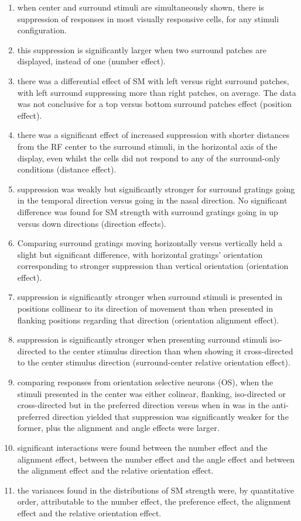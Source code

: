 \begin{enumerate}
\item when center and surround stimuli are simultaneously shown, there is suppression of responses in most visually responsive cells, for any stimuli configuration.
\item this suppression is significantly larger when two surround patches are displayed, instead of one (number effect).
\item there was a differential effect of SM with left versus right surround patches, with left surround suppressing more than right patches, on average. The data was not conclusive for a top versus bottom surround patches effect (position effect).
\item there was a significant effect of increased suppression with shorter distances from the RF center to the surround stimuli, in the horizontal axis of the display, even whilst the cells did not respond to any of the surround-only conditions (distance effect).
\item suppression was weakly but significantly stronger for surround gratings going in the temporal direction versus going in the nasal direction. No significant difference was found for SM strength with surround gratings going in up versus down directions (direction effects).
\item Comparing surround gratings moving horizontally versus vertically held a slight but significant difference, with horizontal gratings' orientation corresponding to stronger suppression than vertical orientation (orientation effect).
\item suppression is significantly stronger when surround stimuli is presented in positions collinear to its direction of movement than when presented in flanking positions regarding that direction (orientation alignment effect).
\item suppression is significantly stronger when presenting surround stimuli iso-directed to the center stimulus direction than when showing it cross-directed to the center stimulus direction (surround-center relative orientation effect).
\item comparing responses from orientation selective neurons (OS), when the stimuli presented in the center was either colinear, flanking, iso-directed or cross-directed but in the preferred direction versus when in was in the anti-preferred direction yielded that suppression was significantly weaker for the former, plus the alignment and angle effects were larger. 
\item significant interactions were found between the number effect and the alignment effect, between the number effect and the angle effect and between the alignment effect and the relative orientation effect. 
\item the variances found in the distributions of SM strength were, by quantitative order, attributable to the number effect, the preference effect, the alignment effect and the relative orientation effect.
\end{enumerate}

